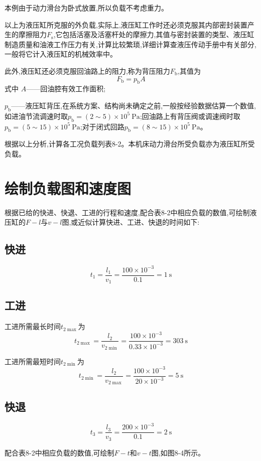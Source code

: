 本例由于动力滑台为卧式放置,所以负载不考虑重力。

以上为液压缸所克服的外负载,实际上,液压缸工作时还必须克服其内部密封装置产生的摩擦阻力$F_{\text{s}}$,它包括活塞及活塞杆处的摩擦力,其值与密封装置的类型、液压缸制造质量和油液工作压力有关,计算比较繁琐,详细计算查液压传动手册中有关部分,一般将它计入液压缸的机械效率中。

此外,液压缸还必须克服回油路上的阻力,称为背压阻力$F_{\text{b}}$,其值为
\begin{equation}
    F_{\text{b}}=p_{\text{b}}A
\end{equation}
式中
$A$——回油腔有效工作面积;

$p_{\text{b}}$——液压缸背压,在系统方案、结构尚未确定之前,一般按经验数据估算一个数值,如进油节流调速时取$p_{\text{b}}=(2\sim 5)\times 10^5\ \text{Pa}$;回油路上有背压阀或调速阀时取$p_{\text{b}}=(5\sim 15)\times 10^5\ \text{Pa}$;对于闭式回路$p_{\text{b}}=(8\sim 15)\times 10^5\ \text{Pa}$。

根据以上分析,计算各工况负载列表8-2。本机床动力滑台所受负载亦为液压缸所受负载。

\section{绘制负载图和速度图}
根据已给的快进、快退、工进的行程和速度,配合表8-2中相应负载的数值,可绘制液压缸的$F-l$与$v-l$图,或近似计算快进、工进、快退的时间如下:

\subsection{快进}
$$t_1=\frac{l_1}{v_1}=\frac{100\times 10^{-3}}{0.1}=1\ \text{s}$$

\subsection{工进}
工进所需最长时间$t_{2\max}$为
$$t_{2\max}=\frac{l_2}{v_{2\min}}=\frac{100\times10^{-3}}{0.33\times 10^{-3}}=303\ \text{s}$$

工进所需最短时间$t_{2\min}$为
$$t_{2\min}=\frac{l_2}{v_{2\max}}=\frac{100\times10^{-3}}{20\times 10^{-3}}=5\ \text{s}$$

\subsection{快退}
$$t_3=\frac{l_3}{v_3}=\frac{200\times10^{-3}}{0.1}=2\ \text{s}$$

配合表8-2中相应负载的数值,可绘制$F-t$和$v-t$图,如图8-4所示。

